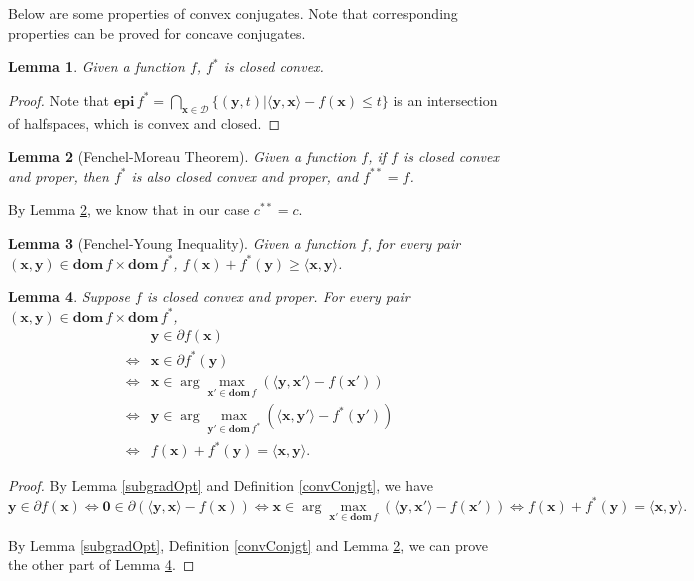 \documentclass{article}
\newtheorem{lemma}{Lemma}[section]
\begin{document}
Below are some properties of convex conjugates. Note that corresponding properties can be proved for concave conjugates.
\begin{lemma}
    Given a function $f$, $f^*$ is closed convex.
\end{lemma}
\begin{proof}
    Note that $\mathbf{epi}\,f^*=\bigcap_{\mathbf{x}\in \mathcal{D}}\{(\mathbf{y},t)|\langle \mathbf{y},\mathbf{x}\rangle-f(\mathbf{x})\le t\}$ is an intersection of halfspaces, which is convex and closed.
\end{proof}
\begin{lemma}[Fenchel-Moreau Theorem]\label{dualDual}
    Given a function $f$, if $f$ is closed convex and proper, then $f^*$ is also closed convex and proper, and $f^{**}=f$.
\end{lemma}
By Lemma \ref{dualDual}, we know that in our case $c^{**}=c$.
\begin{lemma}[Fenchel-Young Inequality]\label{fenchelIneq}
    Given a function $f$, for every pair $(\mathbf{x},\mathbf{y}) \in \mathbf{dom}\,f\times \mathbf{dom}\,f^*$, $f(\mathbf{x})+f^*(\mathbf{y})\ge \langle \mathbf{x},\mathbf{y}\rangle$.
\end{lemma}
\begin{lemma}\label{conjgtSubgrad}
    Suppose $f$ is closed convex and proper. For every pair $(\mathbf{x},\mathbf{y}) \in \mathbf{dom}\,f\times \mathbf{dom}\,f^*$,
    \begin{equation}
        \begin{array}{cl}
             & \mathbf{y} \in \partial f(\mathbf{x}) \\
            \iff & \mathbf{x} \in \partial f^*(\mathbf{y}) \\
            \iff & \mathbf{x} \in \arg\max_{\mathbf{x}'\in \mathbf{dom}\,f} ( \langle \mathbf{y},\mathbf{x}'\rangle - f(\mathbf{x}') ) \\
            \iff & \mathbf{y} \in \arg\max_{\mathbf{y}'\in \mathbf{dom}\,f^*} ( \langle \mathbf{x},\mathbf{y}'\rangle - f^*(\mathbf{y}') ) \\
            \iff & f(\mathbf{x})+f^*(\mathbf{y})=\langle \mathbf{x},\mathbf{y}\rangle.
        \end{array}
    \end{equation}
\end{lemma}
\begin{proof}
    By Lemma \ref{subgradOpt} and Definition \ref{convConjgt}, we have
    \begin{equation}
        \mathbf{y}\in\partial f(\mathbf{x})\iff \mathbf{0}\in\partial(\langle \mathbf{y},\mathbf{x}\rangle-f(\mathbf{x}))\iff \mathbf{x} \in \arg\max_{\mathbf{x}'\in \mathbf{dom}\,f} ( \langle \mathbf{y},\mathbf{x}'\rangle - f(\mathbf{x}') )\iff f(\mathbf{x})+f^*(\mathbf{y})=\langle \mathbf{x},\mathbf{y}\rangle.
    \end{equation}

    By Lemma \ref{subgradOpt}, Definition \ref{convConjgt} and Lemma \ref{dualDual}, we can prove the other part of Lemma \ref{conjgtSubgrad}.
\end{proof}
\end{document}
